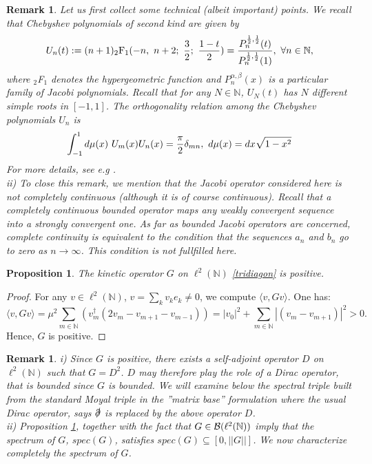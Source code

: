 \documentclass[a4paper,11pt,twoside]{article}
\numberwithin{equation}{section}
\newtheorem{proposition}[Theorem]{Proposition}
\newtheorem{remark}[Theorem]{Remark}
\theoremstyle{nonumberplain}
\newtheorem{proof}{Proof}
\newcounter{and}
\begin{document}
\begin{remark}
Let us first collect some technical (albeit important) points. We recall that Chebyshev polynomials of second kind are given by
\begin{equation}
U_n(t):=(n+1){\mbox{$_2$F$_1$}(-n,\ n+2;\ {{3}\over{2}};\ {{1-t}\over{2}})}={{P_n^{{{1}\over{2}},{{1}\over{2}}}(t) }\over{P_n^{{{1}\over{2}},{{1}\over{2}}}(1) }}, \ \forall n\in\mathbb{N}\label{defcheb},
\end{equation}
where $_2$F$_1$ denotes the hypergeometric function and $P_n^{\alpha,\beta}(x)$ is a particular family of Jacobi polynomials. Recall that for any $N\in\mathbb{N}$, $U_N(t)$ has $N$ different simple roots in $[-1,1]$. The orthogonality relation among the Chebyshev polynomials $U_n$ is
\begin{equation}
\int_{-1}^1d\mu(x)\ U_m(x)U_n(x)={{\pi}\over{2}}\delta_{mn},\ d\mu(x)=dx{\sqrt{1-x^2}}\label{orthocontinucheb2}
\end{equation}
For more details, see e.g \cite{kks}. \\
ii) To close this remark, we mention that the Jacobi operator considered here is not completely continuous (although it is of course continuous). Recall that a completely continuous bounded operator maps any weakly convergent sequence into a strongly convergent one. As far as bounded Jacobi operators are concerned, complete continuity is equivalent to the condition that the sequences $a_n$ and $b_n$ go to zero as $n\to\infty$. This condition is not fullfilled here.
\end{remark}
\begin{proposition}\label{g-positive}
The kinetic operator $G$ on $\ell^2(\mathbb{N})$ \eqref{tridiagon} is positive.
\end{proposition}
\begin{proof}
For any $v\in\ell^2(\mathbb{N})$, $v=\sum_kv_ke_k\ne0$, we compute $\langle v,Gv\rangle$. One has:
\begin{equation}
\langle v,Gv\rangle=\mu^2\sum_{m\in\mathbb{N}}(v_m^\dag(2v_m-v_{m+1}-v_{m-1}))=|v_0|^2+\sum_{m\in\mathbb{N}}|(v_m-v_{m+1})|^2>0.
\end{equation}
Hence, $G$ is positive.
\end{proof}
\begin{remark}\label{locate-spectrum}
i) Since $G$ is positive, there exists a self-adjoint operator $D$ on $\ell^2(\mathbb{N})$ such that $G=D^2$. $D$ may therefore play the role of a Dirac operator, that is bounded since $G$ is bounded. We will examine below the spectral triple built from the standard Moyal triple in the ''matrix base'' formulation where the usual Dirac operator, says $\slashed\partial$ is replaced by the above operator $D$. \\
ii) Proposition \ref{g-positive}, together with the fact that $G\in{\cal{B}}(\ell^2(\mathbb{N}))$ imply that the spectrum of $G$, $spec(G)$, satisfies $spec(G)\subseteq[0,||G||]$. We now characterize completely the spectrum of $G$.
\end{remark}
\end{document}
